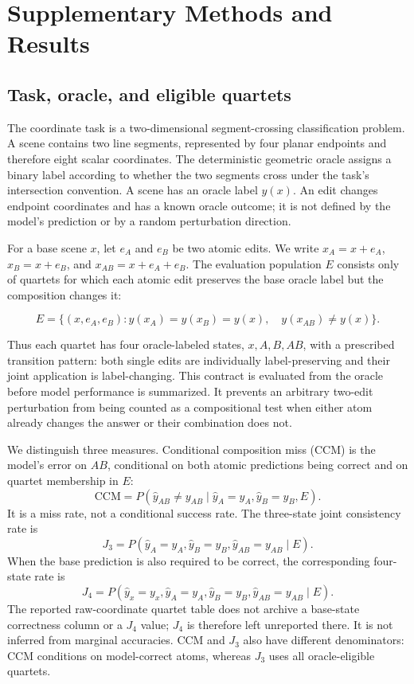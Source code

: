 \hypertarget{supplementary-methods-and-results}{%
\section{Supplementary Methods and Results}\label{supplementary-methods-and-results}}

\hypertarget{task-oracle-and-eligible-quartets}{%
\subsection{Task, oracle, and eligible quartets}\label{task-oracle-and-eligible-quartets}}

The coordinate task is a two-dimensional segment-crossing classification problem. A scene contains two line segments, represented by four planar endpoints and therefore eight scalar coordinates. The deterministic geometric oracle assigns a binary label according to whether the two segments cross under the task's intersection convention. A scene has an oracle label \(y(x)\). An edit changes endpoint coordinates and has a known oracle outcome; it is not defined by the model's prediction or by a random perturbation direction.

For a base scene \(x\), let \(e_A\) and \(e_B\) be two atomic edits. We write \(x_A=x+e_A\), \(x_B=x+e_B\), and \(x_{AB}=x+e_A+e_B\). The evaluation population \(E\) consists only of quartets for which each atomic edit preserves the base oracle label but the composition changes it:

\[
E=\{(x,e_A,e_B): y(x_A)=y(x_B)=y(x),\quad y(x_{AB})\ne y(x)\}.
\]

Thus each quartet has four oracle-labeled states, \(x,A,B,AB\), with a prescribed transition pattern: both single edits are individually label-preserving and their joint application is label-changing. This contract is evaluated from the oracle before model performance is summarized. It prevents an arbitrary two-edit perturbation from being counted as a compositional test when either atom already changes the answer or their combination does not.

We distinguish three measures. Conditional composition miss (CCM) is the model's error on \(AB\), conditional on both atomic predictions being correct and on quartet membership in \(E\): \[
\mathrm{CCM}=P(\hat y_{AB}\ne y_{AB}\mid \hat y_A=y_A,\hat y_B=y_B,E).
\] It is a miss rate, not a conditional success rate. The three-state joint consistency rate is \[
J_3=P(\hat y_A=y_A,\hat y_B=y_B,\hat y_{AB}=y_{AB}\mid E).
\] When the base prediction is also required to be correct, the corresponding four-state rate is \[
J_4=P(\hat y_x=y_x,\hat y_A=y_A,\hat y_B=y_B,\hat y_{AB}=y_{AB}\mid E).
\] The reported raw-coordinate quartet table does not archive a base-state correctness column or a \(J_4\) value; \(J_4\) is therefore left unreported there. It is not inferred from marginal accuracies. CCM and \(J_3\) also have different denominators: CCM conditions on model-correct atoms, whereas \(J_3\) uses all oracle-eligible quartets.

